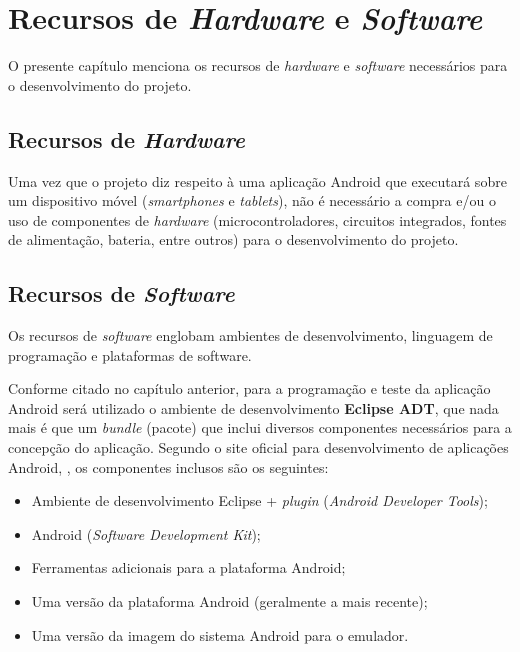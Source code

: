 \chapter{Recursos de \textit{Hardware} e \textit{Software}}\label{cap:recursos}

O presente capítulo menciona os recursos de \textit{hardware} e \textit{software} necessários para o desenvolvimento do projeto.

\section{Recursos de \textit{Hardware}}\label{s:hardware}

Uma vez que o projeto diz respeito à uma aplicação Android que executará sobre um dispositivo móvel (\textit{smartphones} e \textit{tablets}), não é necessário a compra e/ou o uso de componentes de \textit{hardware} (microcontroladores, circuitos integrados, fontes de alimentação, bateria, entre outros) para o desenvolvimento do projeto.


\section{Recursos de \textit{Software}}\label{s:software}


Os recursos de \textit{software} englobam ambientes de desenvolvimento, linguagem de programação e plataformas de software.

Conforme citado no capítulo anterior, para a programação e teste da aplicação Android será utilizado o ambiente de desenvolvimento \textbf{Eclipse ADT}, que nada mais é que um \textit{bundle} (pacote) que inclui diversos componentes necessários para a concepção do aplicação. Segundo o site oficial para desenvolvimento de aplicações Android, , os componentes inclusos são os seguintes:

\begin{itemize}
\item Ambiente de desenvolvimento Eclipse + \textit{plugin}  (\textit{Android Developer Tools});
\item Android  (\textit{Software Development Kit});
\item Ferramentas adicionais para a plataforma Android;
\item Uma versão da plataforma Android (geralmente a mais recente);
\item Uma versão da imagem do sistema Android para o emulador.
\end{itemize}


